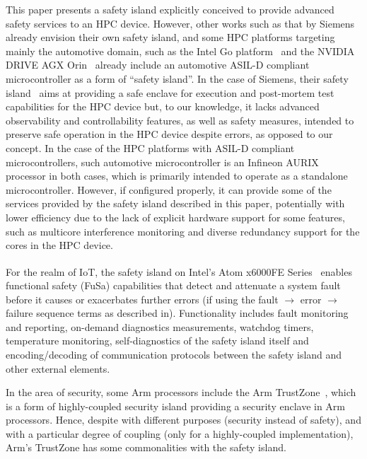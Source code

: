 This paper presents a safety island explicitly conceived to provide advanced safety services to an HPC device. However, other works such as that by Siemens~\cite{SiemensSI} already envision their own safety island, and some HPC platforms targeting mainly the automotive domain, such as the Intel Go platform~\cite{IntelGo} and the NVIDIA DRIVE AGX Orin~\cite{NVIDIAdrive,NVIDIAdrive2} already include an automotive ASIL-D compliant microcontroller as a form of ``safety island''. 
In the case of Siemens, their safety island~\cite{SiemensSI} aims at providing a safe enclave for execution and post-mortem test capabilities for the HPC device but, to our knowledge, it lacks advanced observability and controllability features, as well as safety measures, intended to preserve safe operation in the HPC device despite errors, as opposed to our concept.
In the case of the HPC platforms with ASIL-D compliant microcontrollers, such automotive microcontroller is an Infineon AURIX processor in both cases, which is primarily intended to operate as a standalone microcontroller. However, if configured properly, it can provide some of the services provided by the safety island described in this paper, potentially with lower efficiency due to the lack of explicit hardware support for some features, such as multicore interference monitoring and diverse redundancy support for the cores in the HPC device.

For the realm of IoT, the safety island on Intel's Atom\textsuperscript{\textregistered} x6000FE Series~\cite{ElkhartLake} enables functional safety (FuSa) capabilities that detect and attenuate a system fault before it causes or exacerbates further errors (if using the fault $\rightarrow$ error $\rightarrow$ failure sequence terms as described in\cite{avizienis2004basic}). Functionality includes fault monitoring and reporting, on-demand diagnostics measurements, watchdog timers, temperature monitoring, self-diagnostics of the safety island itself and encoding/decoding of communication protocols between the safety island and other external elements.

In the area of security, some Arm processors include the Arm TrustZone~\cite{TrustZone}, which is a form of highly-coupled security island providing a security enclave in Arm processors. Hence, despite with different purposes (security instead of safety), and with a particular degree of coupling (only for a highly-coupled implementation), Arm's TrustZone has some commonalities with the safety island.

